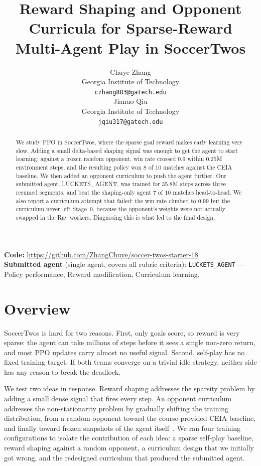 \documentclass{article}
\title{Reward Shaping and Opponent Curricula for Sparse-Reward Multi-Agent Play in SoccerTwos}
\author{
  Chuye Zhang \\
  Georgia Institute of Technology \\
  \texttt{czhang883@gatech.edu} \\
  \And
  Jianuo Qiu \\
  Georgia Institute of Technology \\
  \texttt{jqiu317@gatech.edu} \\
}
\begin{document}
\maketitle

\begin{abstract}
We study PPO in SoccerTwos, where the sparse goal reward makes early learning very slow.
Adding a small delta-based shaping signal was enough to get the agent to start learning: against a frozen random opponent, win rate crossed $0.9$ within $0.25$M environment steps, and the resulting policy won $8$ of $10$ matches against the CEIA baseline.
We then added an opponent curriculum to push the agent further.
Our submitted agent, LUCKETS\_AGENT, was trained for $35.8$M steps across three resumed segments, and beat the shaping-only agent $7$ of $10$ matches head-to-head.
We also report a curriculum attempt that failed: the win rate climbed to $0.99$ but the curriculum never left Stage~$0$, because the opponent's weights were not actually swapped in the Ray workers.
Diagnosing this is what led to the final design.
\end{abstract}

\begin{center}
\textbf{Code:} \url{https://github.com/ZhangChuye/soccer-twos-starter-18}\\
\textbf{Submitted agent} (single agent, covers all rubric criteria):
\texttt{LUCKETS\_AGENT} \;---\; Policy performance, Reward modification, Curriculum learning.
\end{center}


\section{Overview}

SoccerTwos is hard for two reasons.
First, only goals score, so reward is very sparse: the agent can take millions of steps before it sees a single non-zero return, and most PPO updates carry almost no useful signal.
Second, self-play has no fixed training target.
If both teams converge on a trivial idle strategy, neither side has any reason to break the deadlock.

We test two ideas in response.
Reward shaping addresses the sparsity problem by adding a small dense signal that fires every step.
An opponent curriculum addresses the non-stationarity problem by gradually shifting the training distribution, from a random opponent toward the course-provided CEIA baseline, and finally toward frozen snapshots of the agent itself~\citep{Bengio2009Curriculum}.
We ran four training configurations to isolate the contribution of each idea: a sparse self-play baseline, reward shaping against a random opponent, a curriculum design that we initially got wrong, and the redesigned curriculum that produced the submitted agent.
\end{document}
